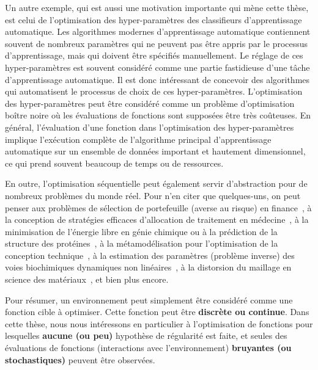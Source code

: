 Un autre exemple, qui est aussi une motivation importante qui mène cette thèse, est celui de l'optimisation des hyper-paramètres des classifieurs d'apprentissage automatique. Les algorithmes modernes d'apprentissage automatique contiennent souvent de nombreux paramètres qui ne peuvent pas être appris par le processus d'apprentissage, mais qui doivent être spécifiés manuellement. Le réglage de ces hyper-paramètres est souvent considéré comme une partie fastidieuse d'une tâche d'apprentissage automatique. Il est donc intéressant de concevoir des algorithmes qui automatisent le processus de choix de ces hyper-paramètres. L'optimisation des hyper-paramètres peut être considéré comme un problème d'optimisation bo\^itre noire où les évaluations de fonctions sont supposées être très coûteuses. En général, l'évaluation d'une fonction dans l'optimisation des hyper-paramètres implique l'exécution complète de l'algorithme principal d'apprentissage automatique sur un ensemble de données important et hautement dimensionnel, ce qui prend souvent beaucoup de temps ou de ressources.

En outre, l'optimisation séquentielle peut également servir d'abstraction pour de nombreux problèmes du monde réel. Pour n'en citer que quelques-uns, on peut penser aux problèmes de sélection de portefeuille (averse au risque) en finance~\citep{ziemba2010}, à la conception de stratégies efficaces d'allocation de traitement en médecine~\citep{durand2018contextual}, à la minimisation de l'énergie libre en génie chimique ou à la prédiction de la structure des protéines~\citep{floudas2000}, à la métamodélisation pour l'optimisation de la conception technique~\citep{wang2007}, à la estimation des paramètres (problème inverse) des voies biochimiques dynamiques non linéaires~\citep{moles2003}, à la distorsion du maillage en science des matériaux~\citep{charpagne2019ebsd}, et bien plus encore. 

Pour résumer, un environnement peut simplement être considéré comme une fonction cible à optimiser. Cette fonction peut être \textbf{discrète ou continue}. Dans cette thèse, nous nous intéressons en particulier à l'optimisation de fonctions pour lesquelles \textbf{aucune (ou peu)} hypothèse de régularité est faite, et seules des évaluations de fonctions (interactions avec l'environnement) \textbf{bruyantes (ou stochastiques)} peuvent être observées.


